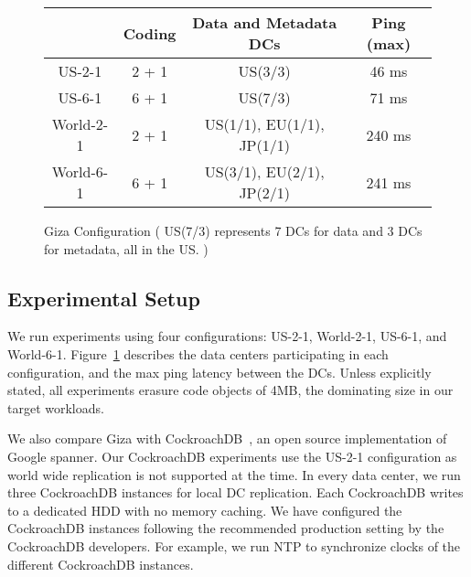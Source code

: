 \begin{figure}
\footnotesize
\centering
\begin{tabular}{c|c|c|c}
          & Coding & Data and Metadata DCs & Ping (max)\\
\hline
US-2-1 	  & 2 + 1 & US(3/3)                   & 46 ms \\
US-6-1 	  & 6 + 1 & US(7/3)                   & 71 ms\\ 
World-2-1 & 2 + 1 & US(1/1), EU(1/1), JP(1/1) & 240 ms\\
World-6-1 & 6 + 1 & US(3/1), EU(2/1), JP(2/1) & 241 ms\\
\end{tabular}
\caption{Giza Configuration ( US(7/3) represents 7 DCs for data and 3 DCs for metadata, all in the US. )} 
\label{fig:dcconfig} 
\end{figure}

\subsection{Experimental Setup}
We run experiments using four configurations: US-2-1, World-2-1, US-6-1, and World-6-1. Figure~\ref{fig:dcconfig} describes the data centers participating in each configuration, and the max ping latency between the DCs. Unless explicitly stated, all experiments erasure code objects of 4MB, the dominating size in our target workloads.

We also compare Giza with CockroachDB~\cite{cockroachdb}, an open source implementation of Google spanner. Our CockroachDB experiments use the US-2-1 configuration as world wide replication is not supported at the time. In every data center, we run three CockroachDB instances for local DC replication. Each CockroachDB writes to a dedicated HDD with no memory caching. We have configured the CockroachDB instances following the recommended production setting by the CockroachDB developers. For example, we run NTP to synchronize clocks of the different CockroachDB instances.


